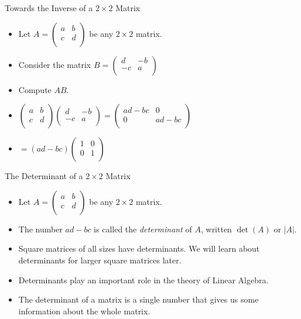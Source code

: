 \documentclass{beamer}
\begin{document}
\begin{frame}{Towards the Inverse of a $2\times 2$ Matrix}

\begin{itemize}
\item Let
$A=
\begin{pmatrix}
a & b  \\
c & d  \\
\end{pmatrix}
$
be any $2\times 2$ matrix.
\item Consider the matrix
$B=
\begin{pmatrix}
 d & -b\\
-c & a \\
\end{pmatrix}
$
\item Compute $AB$.
\item $
\begin{pmatrix}
a & b  \\
c & d  \\
\end{pmatrix}
\begin{pmatrix}
 d & -b\\
-c & a \\
\end{pmatrix}
=
\begin{pmatrix}
 ad-bc & 0\\
0 & ad-bc \\
\end{pmatrix}
$
\item $=(ad-bc)
\begin{pmatrix}
 1 & 0\\
0 & 1 \\
\end{pmatrix}
$
\end{itemize}
\end{frame}

\begin{frame}{The Determinant of a $2\times 2$ Matrix}

\begin{itemize}
\item Let
$A=
\begin{pmatrix}
a & b  \\
c & d  \\
\end{pmatrix}
$
be any $2\times 2$ matrix.
\item The number $ad-bc$ is called the \emph{determinant} of $A$, written $\det(A)$ or $\left | A \right |$.
\item Square matrices of all sizes have determinants. We will learn about
determinants for larger square matrices later.
\item Determinants play an important role in the theory of Linear Algebra.
\item The determinant of a matrix is a single number that gives us some information
about the whole matrix.
\end{itemize}
\end{frame}
\end{document}
